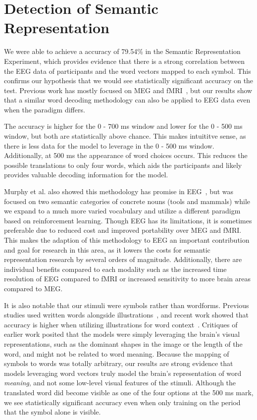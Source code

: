\section{Detection of Semantic Representation}
\label{sec:discussion:semanticrepresentation}

We were able to achieve a \tvt accuracy of 79.54\% in the Semantic 
Representation Experiment, which provides evidence that there is a strong 
correlation between the EEG data of participants and the word vectors mapped to 
each symbol. This confirms our hypothesis that we would see statistically 
significant accuracy on the \tvt test. Previous work has mostly focused on MEG 
and fMRI~\cite{Mitchell2008,Sudre2012}, but our results show that a similar 
word decoding methodology can also be applied to EEG data even when the 
paradigm differs. 

The accuracy is higher for the 0 - 700 ms window and lower for the 0 - 500 ms 
window, but both are statistically above chance. This makes intuititve sense, 
as there is less data for the model to leverage in the 0 - 500 ms window.  
Additionally, at 500 ms the appearance of word choices occurs. This reduces the 
possible translations to only four words, which aids the participants and 
likely provides valuable decoding information for the model.

Murphy et al. also showed this methodology has promise in 
EEG~\cite{Murphy2009}, but was focused on two semantic categories of concrete 
nouns (tools and mammals) while we expand to a much more varied vocabulary and 
utilize a different paradigm based on reinforcement learning. Though EEG has 
its limitations, it is sometimes preferable due to reduced cost and improved 
portability over MEG and fMRI. This makes the adaption of this methodology to 
EEG an important contribution and goal for research in this area, as it lowers 
the costs for semantic representation research by several orders of magnitude.  
Additionally, there are individual benefits compared to each modality such as 
the increased time resolution of EEG compared to fMRI or increased sensitivity 
to more brain areas compared to MEG.

It is also notable that our stimuli were symbols rather than wordforms. 
Previous studies used written words alongside 
illustrations~\cite{Mitchell2008,Sudre2012}, and recent work showed that 
accuracy is higher when utilizing illustrations for word 
context~\cite{pereira2018toward}. Critiques of earlier work posited that the 
models were simply leveraging the brain's visual representations, such as the 
dominant shapes in the image or the length of the word, and might not be 
related to word meaning. Because the mapping of symbols to words was totally 
arbitrary, our results are strong evidence that models leveraging word vectors 
truly model the brain's representation of word \emph{meaning}, and not some 
low-level visual features of the stimuli. Although the translated word did 
become visible as one of the four options at the 500 ms mark, we see 
statistically significant \tvt accuracy even when only training on the period 
that the symbol alone is visible.

